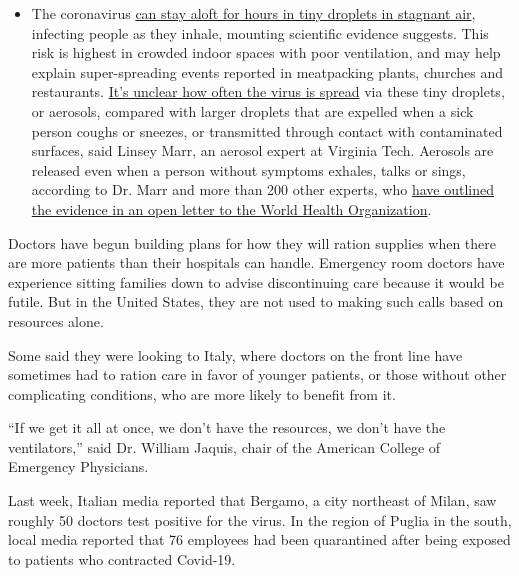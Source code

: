 \begin{itemize}
  \begin{itemize}
  \tightlist
  \item
    The coronavirus
    \href{https://www.nytimes3xbfgragh.onion/2020/07/04/health/239-experts-with-one-big-claim-the-coronavirus-is-airborne.html?action=click\&pgtype=Article\&state=default\&region=MAIN_CONTENT_3\&context=storylines_faq}{can
    stay aloft for hours in tiny droplets in stagnant air}, infecting
    people as they inhale, mounting scientific evidence suggests. This
    risk is highest in crowded indoor spaces with poor ventilation, and
    may help explain super-spreading events reported in meatpacking
    plants, churches and restaurants.
    \href{https://www.nytimes3xbfgragh.onion/2020/07/06/health/coronavirus-airborne-aerosols.html?action=click\&pgtype=Article\&state=default\&region=MAIN_CONTENT_3\&context=storylines_faq}{It's
    unclear how often the virus is spread} via these tiny droplets, or
    aerosols, compared with larger droplets that are expelled when a
    sick person coughs or sneezes, or transmitted through contact with
    contaminated surfaces, said Linsey Marr, an aerosol expert at
    Virginia Tech. Aerosols are released even when a person without
    symptoms exhales, talks or sings, according to Dr. Marr and more
    than 200 other experts, who
    \href{https://academic.oup.com/cid/article/doi/10.1093/cid/ciaa939/5867798}{have
    outlined the evidence in an open letter to the World Health
    Organization}.
  \end{itemize}
\end{itemize}

Doctors have begun building plans for how they will ration supplies when
there are more patients than their hospitals can handle. Emergency room
doctors have experience sitting families down to advise discontinuing
care because it would be futile. But in the United States, they are not
used to making such calls based on resources alone.

Some said they were looking to Italy, where doctors on the front line
have sometimes had to ration care in favor of younger patients, or those
without other complicating conditions, who are more likely to benefit
from it.

``If we get it all at once, we don't have the resources, we don't have
the ventilators,'' said Dr. William Jaquis, chair of the American
College of Emergency Physicians.

Last week, Italian media reported that Bergamo, a city northeast of
Milan, saw roughly 50 doctors test positive for the virus. In the region
of Puglia in the south, local media reported that 76 employees had been
quarantined after being exposed to patients who contracted Covid-19.

